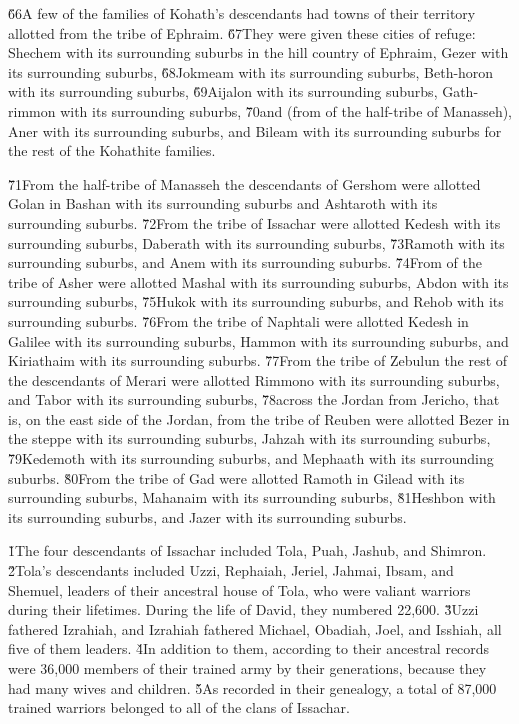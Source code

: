 \v{66}A few of the families of Kohath's descendants had towns of their territory allotted from the tribe of Ephraim. \v{67}They were given these cities of refuge: Shechem with its surrounding suburbs in the hill country of Ephraim, Gezer with its surrounding suburbs, \v{68}Jokmeam with its surrounding suburbs, Beth-horon with its surrounding suburbs, \v{69}Aijalon with its surrounding suburbs, Gath-rimmon with its surrounding suburbs, \v{70}and (from of the half-tribe of Manasseh), Aner with its surrounding suburbs, and Bileam with its surrounding suburbs for the rest of the Kohathite families.

\v{71}From the half-tribe of Manasseh the descendants of Gershom were allotted Golan in Bashan with its surrounding suburbs and Ashtaroth with its surrounding suburbs. \v{72}From the tribe of Issachar were allotted Kedesh with its surrounding suburbs, Daberath with its surrounding suburbs, \v{73}Ramoth with its surrounding suburbs, and Anem with its surrounding suburbs. \v{74}From of the tribe of Asher were allotted Mashal with its surrounding suburbs, Abdon with its surrounding suburbs, \v{75}Hukok with its surrounding suburbs, and Rehob with its surrounding suburbs. \v{76}From the tribe of Naphtali were allotted Kedesh in Galilee with its surrounding suburbs, Hammon with its surrounding suburbs, and Kiriathaim with its surrounding suburbs. \v{77}From the tribe of Zebulun the rest of the descendants of Merari were allotted Rimmono with its surrounding suburbs, and Tabor with its surrounding suburbs, \v{78}across the Jordan from Jericho, that is, on the east side of the Jordan, from the tribe of Reuben were allotted Bezer in the steppe with its surrounding suburbs, Jahzah with its surrounding suburbs, \v{79}Kedemoth with its surrounding suburbs, and Mephaath with its surrounding suburbs. \v{80}From the tribe of Gad were allotted Ramoth in Gilead with its surrounding suburbs, Mahanaim with its surrounding suburbs, \v{81}Heshbon with its surrounding suburbs, and Jazer with its surrounding suburbs.

\v{1}The four descendants of Issachar included Tola, Puah, Jashub, and Shimron. \v{2}Tola's descendants included Uzzi, Rephaiah, Jeriel, Jahmai, Ibsam, and Shemuel, leaders of their ancestral house of Tola, who were valiant warriors during their lifetimes. During the life of David, they numbered 22,600. \v{3}Uzzi fathered Izrahiah, and Izrahiah fathered Michael, Obadiah, Joel, and Isshiah, all five of them leaders. \v{4}In addition to them, according to their ancestral records were 36,000 members of their trained army by their generations, because they had many wives and children. \v{5}As recorded in their genealogy, a total of 87,000 trained warriors belonged to all of the clans of Issachar.


